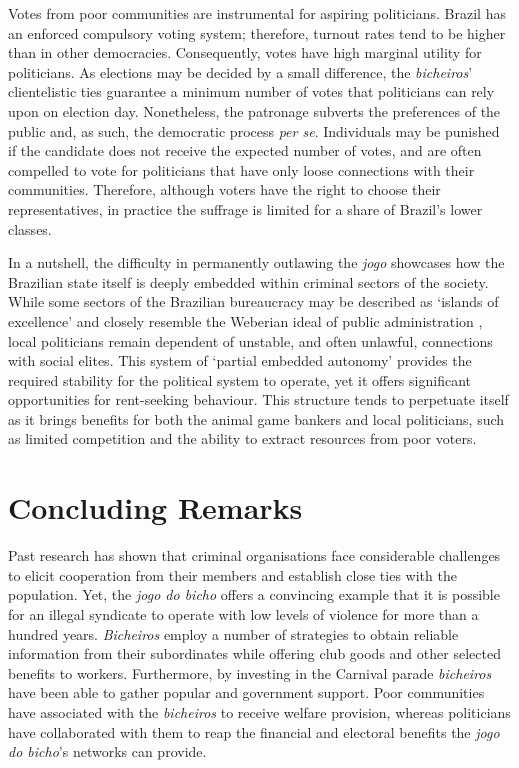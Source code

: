 \documentclass[a4paper,12pt]{article}
\begin{document}
Votes from poor communities are instrumental for aspiring politicians. Brazil has an enforced compulsory voting system; therefore, turnout rates tend to be higher than in other democracies. Consequently, votes have high marginal utility for politicians. As elections may be decided by a small difference, the \emph{bicheiros}' clientelistic ties guarantee a minimum number of votes that politicians can rely upon on election day. Nonetheless, the patronage subverts the preferences of the public and, as such, the democratic process \textit{per se}. Individuals may be punished if the candidate does not receive the expected number of votes, and are often compelled to vote for politicians that have only loose connections with their communities. Therefore, although voters have the right to choose their representatives, in practice the suffrage is limited for a share of Brazil's lower classes.

In a nutshell, the difficulty in permanently outlawing the \textit{jogo} showcases how the Brazilian state itself is deeply embedded within criminal sectors of the society. While some sectors of the Brazilian bureaucracy may be described as `islands of excellence' and closely resemble the Weberian ideal of public administration \citep{bersch2017state}, local politicians remain dependent of unstable, and often unlawful, connections with social elites. This system of `partial embedded autonomy' \citep{evans1995embedded} provides the required stability for the political system to operate, yet it offers significant opportunities for rent-seeking behaviour. This structure tends to perpetuate itself as it brings benefits for both the animal game bankers and local politicians, such as limited competition and the ability to extract resources from poor voters.   

\section{Concluding Remarks}
\label{sec:conclusion3}

Past research has shown that criminal organisations face considerable challenges to elicit cooperation from their members and establish close ties with the population. Yet, the \textit{jogo do bicho} offers a convincing example that it is possible for an illegal syndicate to operate with low levels of violence for more than a hundred years. \textit{Bicheiros} employ a number of strategies to obtain reliable information from their subordinates while offering club goods and other selected benefits to workers. Furthermore, by investing in the Carnival parade \textit{bicheiros} have been able to gather popular and government support. Poor communities have associated with the \textit{bicheiros} to receive welfare provision, whereas politicians have collaborated with them to reap the financial and electoral benefits the \textit{jogo do bicho}'s networks can provide.
\end{document}
